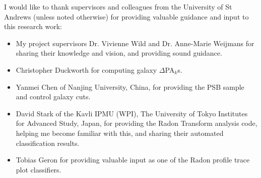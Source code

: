
I would like to thank supervisors and colleagues from the University of St Andrews (unless noted otherwise) for providing valuable guidance and input to this research work:
\begin{itemize}
    \item My project supervisors Dr. Vivienne Wild and Dr. Anne-Marie Weijmans for sharing their knowledge and vision, and providing sound guidance. 
    \item Christopher Duckworth for computing galaxy $\Delta$PA$_{k}$s.
    \item Yanmei Chen of Nanjing University, China, for providing the PSB sample and control galaxy cuts.
    \item David Stark of the Kavli IPMU (WPI), The University of Tokyo Institutes for Advanced Study, Japan, for providing the Radon Transform analysis code, helping me become familiar with this, and sharing their automated classification results.
    \item Tobias Geron for providing valuable input as one of the Radon profile trace plot classifiers.
\end{itemize}
